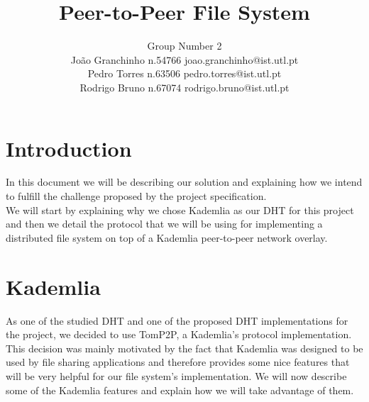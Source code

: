 \documentclass[times,9pt,article]{llncs}
\begin{document}
\title{Peer-to-Peer File System}

\author{Group Number 2 \\
Jo\~ao Granchinho n.54766 joao.granchinho@ist.utl.pt \\
Pedro Torres  n.63506 pedro.torres@ist.utl.pt \\
Rodrigo Bruno n.67074 rodrigo.bruno@ist.utl.pt}
\maketitle


\section{Introduction}
In this document we will be describing our solution and explaining how we intend
to fulfill the challenge proposed by the project specification.\\
We will start by explaining why we chose Kademlia as our DHT for this project and
 then we detail the protocol that we will be using for implementing a distributed
file system on top of a Kademlia peer-to-peer network overlay.

\section{Kademlia}

As one of the studied DHT and one of the proposed DHT implementations for the 
project, we decided to use TomP2P, a Kademlia's protocol implementation.\\
This decision was mainly motivated by the fact that Kademlia was designed to be
used by file sharing applications and therefore provides some nice features that
will be very helpful for our file system's implementation. We will now describe
 some of the Kademlia features and explain how we will take 
advantage of them. 
\end{document}
